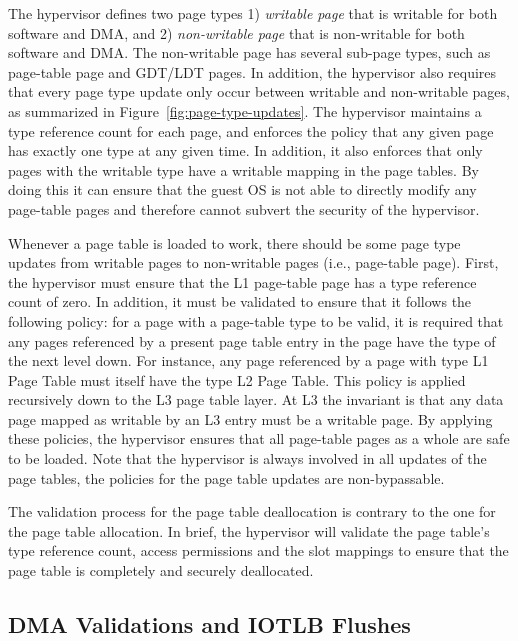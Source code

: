 The hypervisor defines two page types 1) \emph{writable page} that is writable for both software and DMA, and 2) \emph{non-writable page} that is non-writable for both software and DMA.
The non-writable page has several sub-page types, such as page-table page and GDT/LDT pages.
In addition, the hypervisor also requires that every page type update only occur between writable and non-writable pages, as summarized in Figure~\ref{fig:page-type-updates}.
The hypervisor maintains a type reference count for each page, and enforces the policy that any given page has exactly one type at any given time.
In addition, it also enforces that only pages with the writable type have a writable mapping in the page tables.
By doing this it can ensure that the guest OS is not able to directly modify any page-table pages and therefore cannot subvert the security of the hypervisor.

Whenever a page table is loaded to work, there should be some page type updates from writable pages to non-writable pages (i.e., page-table page).
First, the hypervisor must ensure that the L1 page-table page has a type reference count of zero.
In addition, it must be validated to ensure that it follows the following policy:
for a page with a page-table type to be valid, it is required that any pages referenced
by a present page table entry in the page have the type of the next level down.
For instance, any page referenced by a page with type L1 Page Table must itself have the type L2 Page Table.
This policy is applied recursively down to the L3 page table layer.
At L3 the invariant is that any data page mapped as writable by an L3 entry must be a writable page.
By applying these policies, the hypervisor ensures that all page-table pages as a whole are safe to be loaded.
Note that the hypervisor is always involved in all updates of the page tables, the policies for the page table updates are non-bypassable.

The validation process for the page table deallocation is contrary to the one for the page table allocation.
In brief, the hypervisor will validate the page table's type reference count, access permissions and the slot mappings to ensure that the page table is completely and securely deallocated.

\subsection{DMA Validations and IOTLB Flushes}
